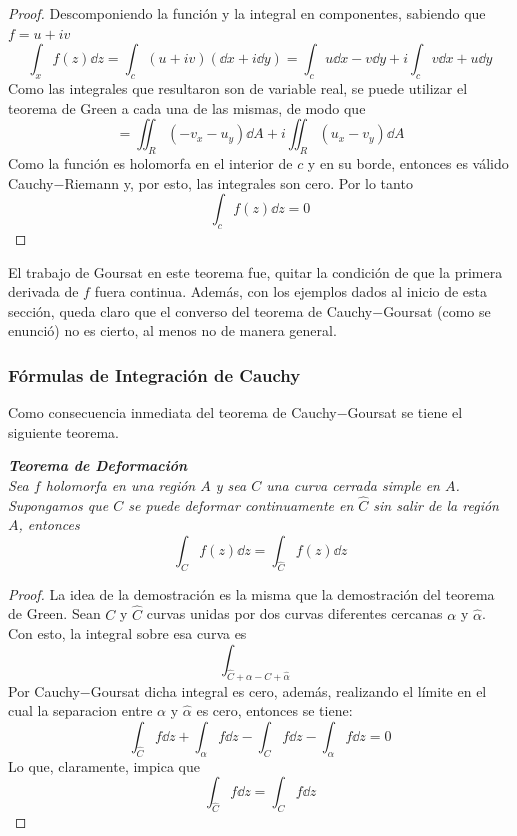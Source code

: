 \begin{proof}
	Descomponiendo la función y la integral en componentes, sabiendo que $f = u + iv$
		$$\int _x f(z) \dd{z} = \int _c (u+iv)(\dd{x} + i\dd{y}) = \int _c u\dd{x} - v\dd{y} + i\int _c v\dd{x} + u\dd{y}$$
	Como las integrales que resultaron son de variable real, se puede utilizar el teorema de Green a cada una de las mismas, de modo que
		$$ = \iint _R (-v_x - u_y) \dd{A} + i\iint _R (u_x - v_y) \dd{A}$$
	Como la función es holomorfa en el interior de $c$ y en su borde, entonces es válido Cauchy$-$Riemann y, por esto, las integrales son cero. Por lo tanto
		$$\int _c f(z) \dd{z} = 0$$
\end{proof}


El trabajo de Goursat en este teorema fue, quitar la condición de que la primera derivada de $f$ fuera continua. Además, con los ejemplos dados al inicio de esta sección, queda claro que el converso del teorema de Cauchy$-$Goursat (como se enunció) no es cierto, al menos no de manera general.





\subsubsection{Fórmulas de Integración de Cauchy}


Como consecuencia inmediata del teorema de Cauchy$-$Goursat se tiene el siguiente teorema.

\begin{teorema} \it
	{\bf Teorema de Deformación} \\
	Sea $f$ holomorfa en una región $A$ y sea $C$ una curva cerrada simple en $A$. Supongamos que $C$ se puede deformar continuamente en $\hat{C}$ sin salir de la región $A$, entonces
		$$\int _C f(z) \dd{z} = \int _{\hat{C}} f(z) \dd{z}$$
	\begin{proof}
		La idea de la demostración es la misma que la demostración del teorema de Green. Sean $C$ y $\hat{C}$ curvas unidas por dos curvas diferentes cercanas $\alpha$ y $\hat{\alpha}$. Con esto, la integral sobre esa curva es
			$$\int _{\hat{C} + \alpha - C + \hat{\alpha}}$$
		Por Cauchy$-$Goursat dicha integral es cero, además, realizando el límite en el cual la separacion entre $\alpha$ y $\hat{\alpha}$ es cero, entonces se tiene:
			$$\int _{\hat{C}} f \dd{z} + \int _{\alpha} f \dd{z} - \int _{C} f \dd{z} - \int _{\alpha} f \dd{z} = 0$$
		Lo que, claramente, impica que
			$$\int _{\hat{C}} f \dd{z} = \int _{C} f \dd{z}$$
	\end{proof}
\end{teorema}


